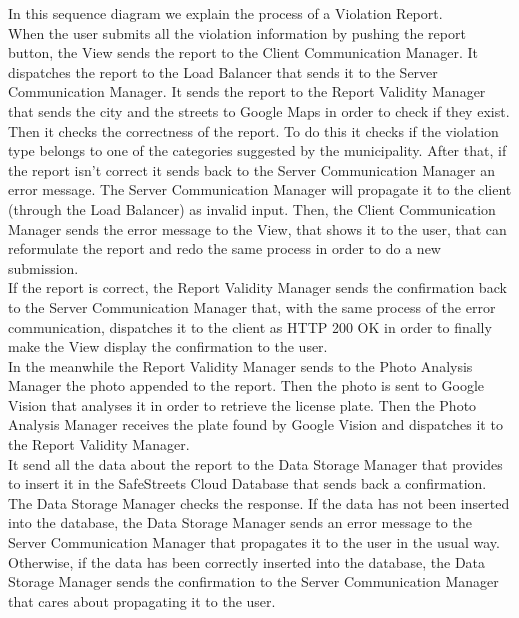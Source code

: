 \documentclass[titlepage]{article}
\begin{document}
In this sequence diagram we explain the process of a Violation Report. \\
When the user submits all the violation information by pushing the report button, the View sends the report to the Client Communication Manager. It dispatches the report to the Load Balancer that sends it to the Server Communication Manager. It sends the report to the Report Validity Manager that sends the city and the streets to Google Maps in order to check if they exist. Then it checks the correctness of the report. To do this it checks if the violation type belongs to one of the categories suggested by the municipality.
After that, if the report isn't correct it sends back to the Server Communication Manager an error message. The Server Communication Manager will propagate it to the client (through the Load Balancer) as invalid input.
Then, the Client Communication Manager sends the error message to the View, that shows it to the user, that can reformulate the report and redo the same process in order to do a new submission. \\
If the report is correct, the Report Validity Manager sends the confirmation back to the Server Communication Manager that, with the same process of the error communication, dispatches it to the client as HTTP 200 OK in order to finally make the View display the confirmation to the user. \\
In the meanwhile the Report Validity Manager sends to the Photo Analysis Manager the photo appended to the report. Then the photo is sent to Google Vision that analyses it in order to retrieve the license plate. Then the Photo Analysis Manager receives the plate found by Google Vision and dispatches it to the Report Validity Manager. \\
It send all the data about the report to the Data Storage Manager that provides to insert it in the SafeStreets Cloud Database that sends back a confirmation.
The Data Storage Manager checks the response. If the data has not been inserted into the database, the Data Storage Manager sends an error message to the Server Communication Manager that propagates it to the user in the usual way. Otherwise, if the data has been correctly inserted into the database, the Data Storage Manager sends the confirmation to the Server Communication Manager that cares about propagating it to the user.
\end{document}
